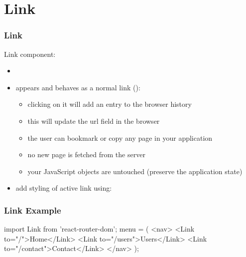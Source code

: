 \section{Link}
\begin{frame}[fragile] \frametitle{Link}
Link component:
\begin{itemize}
  \item {}
  \item appears and behaves as a normal link ():
  \begin{itemize}
    \item clicking on it will add an entry to the browser history
    \item this will update the url field in the browser
    \item the user can bookmark or copy any page in your application
    \item no new page is fetched from the server
    \item your JavaScript objects are untouched (preserve the application state)
  \end{itemize}
  \item add styling of active link using:\\ 
\end{itemize}
\end{frame}

\begin{frame}[fragile] \frametitle{Link Example}
\begin{CodeBox}{}
import { Link } from 'react-router-dom';
menu = (
  <nav>
    <Link to="/">Home</Link>
    <Link to="/users">Users</Link>
    <Link to="/contact">Contact</Link>
  </nav>
);
\end{CodeBox}
\end{frame}

